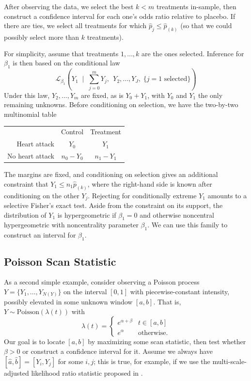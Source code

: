 \documentclass{article}
\theoremstyle{definition}
\newcommand{\Gv}{\;\;\big|\;\;}
\newcommand{\cL}{\mathcal{L}}
\begin{document}
After observing the data, we select the best $k<m$ treatments in-sample, then construct a confidence interval for each one's odds ratio relative to placebo. If there are ties, we select all treatments for which $\hat p_j \leq \hat p_{(k)}$ (so that we could possibly select more than $k$ treatments).

For simplicity, assume that treatments $1,\ldots,k$ are the ones selected. Inference for $\beta_1$ is then based on the conditional law
\begin{equation}
  \cL_{\beta_1}\left( Y_1  \Gv
    \sum_{j=0}^m Y_j,\;\, Y_2, \ldots, Y_J, \;
     \{j=1 \text{ selected}\}\right)
\end{equation}
Under this law, $Y_2,\ldots,Y_m$ are fixed, as is $Y_0+Y_1$, with $Y_0$ and $Y_1$ the only remaining unknowns. Before conditioning on selection, we have the two-by-two multinomial table

\renewcommand{\arraystretch}{2}

\begin{center}
\begin{tabular}{ r|c|c| }
\multicolumn{1}{r}{}
 &  \multicolumn{1}{c}{Control}
 & \multicolumn{1}{c}{Treatment} \\
\cline{2-3}
Heart attack & $Y_0$ & $Y_1$ \\
\cline{2-3}
No heart attack & $n_0-Y_0$ & $n_1-Y_1$ \\
\cline{2-3}
\end{tabular}
\end{center}

The margins are fixed, and conditioning on selection gives an additional constraint that $Y_1 \leq n_1 \hat p_{(k)}$, where the right-hand side is known after conditioning on the other $Y_j$. Rejecting for conditionally extreme $Y_1$ amounts to a selective Fisher's exact test. Aside from the constraint on its support, the distribution of $Y_1$ is hypergeometric if $\beta_1=0$ and otherwise noncentral hypergeometric with noncentrality parameter $\beta_1$. We can use this family to construct an interval for $\beta_1$.

\subsection{Poisson Scan Statistic}\label{sec:poisson}

As a second simple example, consider observing a Poisson process $Y=\{Y_1,\ldots,Y_{N(Y)}\}$ on the interval $[0,1]$ with piecewise-constant intensity, possibly elevated in some unknown window $[a,b]$. That is, $Y\sim \text{Poisson}(\lambda(t))$ with
\begin{equation}
  \lambda(t) = \begin{cases}
    e^{\alpha+\beta} &  t\in[a,b]\\
    e^\alpha &  \text{otherwise.}
  \end{cases}
\end{equation}
Our goal is to locate $[a,b]$ by maximizing some scan statistic, then test whether $\beta>0$ or construct a confidence interval for it. Assume we always have $[\hat a, \hat b] = [Y_i,Y_j]$ for some $i,j$; this is true, for example, if we use the multi-scale-adjusted likelihood ratio statistic proposed in \citet{rivera2013optimal}.
\end{document}
